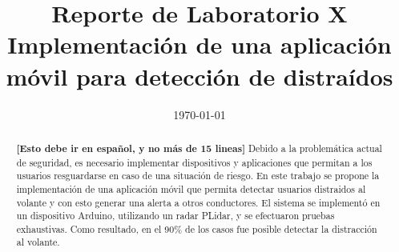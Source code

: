 \documentclass[conference]{IEEEtran}
\date{\specialdate\today}
\begin{document}
%
%
%

\newcommand{\breite}{0.9} %
\newcommand{\RelacionFiguradoscolumnas}{0.9}
\newcommand{\RelacionFiguradoscolumnasPuntoCinco}{0.45}




\title{Reporte de Laboratorio X \\ Implementación de una aplicación móvil para detección de distraídos}

\author{
}



\maketitle

\begin{abstract} 
\textbf{[Esto debe ir en español, y no más de 15 lineas]} Debido a la problemática actual de seguridad, es necesario implementar dispositivos y aplicaciones que permitan a los usuarios resguardarse en caso de una situación de riesgo. En este trabajo se propone la implementación de una aplicación móvil que permita detectar usuarios distraidos al volante y con esto generar una alerta a otros conductores. El sistema se implementó en un dispositivo Arduino, utilizando un radar PLidar, y se efectuaron pruebas exhaustivas. Como resultado, en el 90\% de los casos fue posible detectar la distracción al volante. 
\end{abstract}


\end{document}
